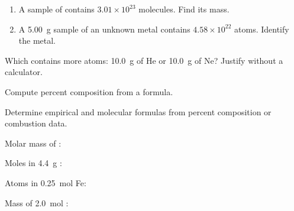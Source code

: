 \documentclass{apchem-notes}
\begin{document}

\begin{enumerate}[leftmargin=*,itemsep=0.4em]
  \item A sample of  contains $3.01\times10^{23}$ molecules. Find its
        mass. \workspace[2.2cm]
  \item A \SI{5.00}{\gram} sample of an unknown metal contains
        $4.58\times10^{22}$ atoms. Identify the metal.
        \workspace[2.4cm]
\end{enumerate}

\begin{exitticket}
Which contains more atoms: \SI{10.0}{\gram} of He or \SI{10.0}{\gram} of Ne?
Justify without a calculator. 
\end{exitticket}


\begin{objectives}
  \item Compute percent composition from a formula.
  \item Determine empirical and molecular formulas from percent composition
        or combustion data.
\end{objectives}


\begin{warmup}[4]
  \item Molar mass of :
  \item Moles in \SI{4.4}{\gram} : 
  \item Atoms in \SI{0.25}{\mole} Fe: 
  \item Mass of \SI{2.0}{\mole} : 
\end{warmup}
\end{document}
